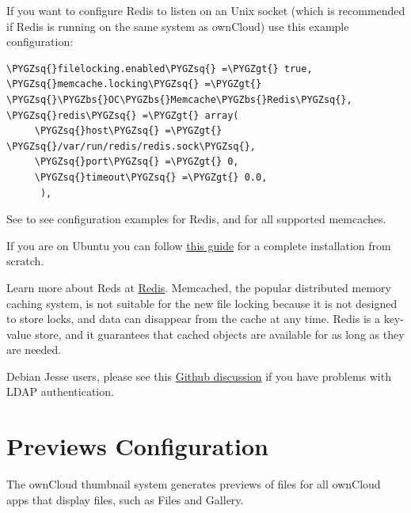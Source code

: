 \documentclass[letterpaper,10pt,english]{sphinxmanual}
\def\PYGZbs{\char`\\}
\def\PYGZgt{\char`\>}
\def\PYGZsq{\char`\'}
\begin{document}
If you want to configure Redis to listen on an Unix socket (which is
recommended if Redis is running on the same system as ownCloud) use this example
 configuration:

\begin{Verbatim}[commandchars=\\\{\}]
\PYGZsq{}filelocking.enabled\PYGZsq{} =\PYGZgt{} true,
\PYGZsq{}memcache.locking\PYGZsq{} =\PYGZgt{} \PYGZsq{}\PYGZbs{}OC\PYGZbs{}Memcache\PYGZbs{}Redis\PYGZsq{},
\PYGZsq{}redis\PYGZsq{} =\PYGZgt{} array(
     \PYGZsq{}host\PYGZsq{} =\PYGZgt{} \PYGZsq{}/var/run/redis/redis.sock\PYGZsq{},
     \PYGZsq{}port\PYGZsq{} =\PYGZgt{} 0,
     \PYGZsq{}timeout\PYGZsq{} =\PYGZgt{} 0.0,
      ),
\end{Verbatim}

See  to see configuration examples for Redis, and for all
supported memcaches.

If you are on Ubuntu you can follow \href{https://www.techandme.se/how-to-configure-redis-cache-in-ubuntu-14-04-with-owncloud/}{this guide} for a complete installation from scratch.

Learn more about Reds at \href{http://redis.io/}{Redis}. Memcached, the popular
distributed memory caching system, is not suitable for the new file locking
because it is not designed to store locks, and data can disappear from the cache
at any time. Redis is a key-value store, and it guarantees that cached objects
are available for as long as they are needed.

Debian Jesse users, please see this \href{https://github.com/owncloud/core/issues/20675}{Github discussion} if you have problems with
LDAP authentication.


\section{Previews Configuration}
\label{configuration_files/previews_configuration:previews-configuration}\label{configuration_files/previews_configuration::doc}
The ownCloud thumbnail system generates previews of files for all
ownCloud apps that display files, such as Files and Gallery.
\end{document}
